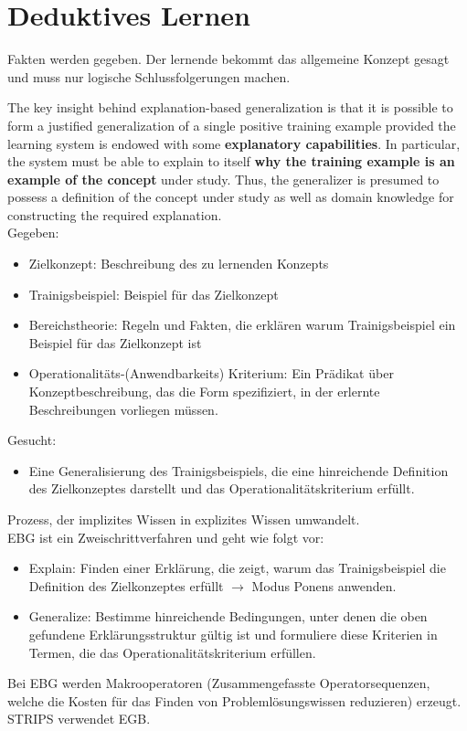 \chapter{Deduktives Lernen}
Fakten werden gegeben. Der lernende bekommt das allgemeine Konzept gesagt und
 muss nur logische Schlussfolgerungen machen.

The key insight behind explanation-based generalization
is that it is possible to form a justified generalization of a
single positive training example provided the learning
system is endowed with some \textbf{explanatory capabilities}. In
particular, the system must be able to explain to itself \textbf{why
the training example is an example of the concept} under
study. Thus, the generalizer is presumed to possess a
definition of the concept under study as well as domain
knowledge for constructing the required explanation.\\

Gegeben:
\begin{itemize}
    \item Zielkonzept: Beschreibung des zu lernenden Konzepts
    \item Trainigsbeispiel: Beispiel für das Zielkonzept
    \item Bereichstheorie: Regeln und Fakten, die erklären warum Trainigsbeispiel
    ein Beispiel für das Zielkonzept ist
    \item Operationalitäts-(Anwendbarkeits) Kriterium: Ein Prädikat über
    Konzeptbeschreibung, das die Form spezifiziert, in der erlernte Beschreibungen
    vorliegen müssen.
\end{itemize}

Gesucht:
\begin{itemize}
    \item Eine Generalisierung des Trainigsbeispiels, die eine hinreichende
    Definition des Zielkonzeptes darstellt und das Operationalitätskriterium erfüllt.

\end{itemize}
Prozess, der implizites Wissen in explizites Wissen umwandelt. \\
EBG ist ein Zweischrittverfahren und geht wie folgt vor:
\begin{itemize}
    \item Explain: Finden einer Erklärung, die zeigt, warum das Trainigsbeispiel
    die Definition des Zielkonzeptes erfüllt $\rightarrow$ Modus Ponens anwenden.
    \item Generalize: Bestimme hinreichende Bedingungen, unter denen die oben
gefundene Erklärungsstruktur gültig ist und formuliere diese
Kriterien in Termen, die das Operationalitätskriterium erfüllen.
\end{itemize}
Bei EBG werden Makrooperatoren (Zusammengefasste Operatorsequenzen, welche die
Kosten für das Finden von Problemlösungswissen reduzieren) erzeugt.
STRIPS verwendet EGB.

